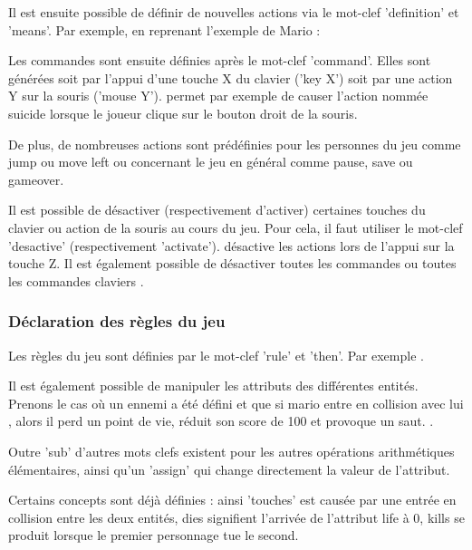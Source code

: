 Il est ensuite possible de définir de nouvelles actions via le mot-clef 'definition' et 'means'.
Par exemple, en reprenant l'exemple de Mario : 

Les commandes sont ensuite définies après le mot-clef 'command'. Elles sont générées soit par l'appui d'une touche X du clavier ('key X') soit par 
une action Y sur la souris ('mouse Y').
 permet par exemple de causer l'action nommée suicide lorsque le joueur clique sur le bouton droit de la souris.

De plus, de nombreuses actions sont prédéfinies pour les personnes du jeu comme jump ou move left ou concernant le jeu en général comme pause, save ou gameover.

Il est possible de désactiver (respectivement d'activer) certaines touches du clavier ou action de la souris au cours du jeu.
Pour cela, il faut utiliser le mot-clef 'desactive' (respectivement 'activate').
 désactive les actions lors de l'appui sur la touche Z.
Il est également possible de désactiver toutes les commandes  ou toutes les commandes claviers .

\subsubsection{Déclaration des règles du jeu}

Les règles du jeu sont définies par le mot-clef 'rule' et 'then'.
Par exemple .

Il est également possible de manipuler les attributs des différentes entités. Prenons le cas où un ennemi a été défini 
et que si mario entre en collision avec lui , alors il perd un point de vie, réduit son score de 100 et provoque un saut.
.

Outre 'sub' d'autres mots clefs existent pour les autres opérations arithmétiques élémentaires, ainsi qu'un 'assign' qui change directement
la valeur de l'attribut.

Certains concepts sont déjà définies : ainsi 'touches' est causée par une entrée en collision entre les deux entités, dies signifient l'arrivée de l'attribut
life à 0, kills se produit lorsque le premier personnage tue le second.

